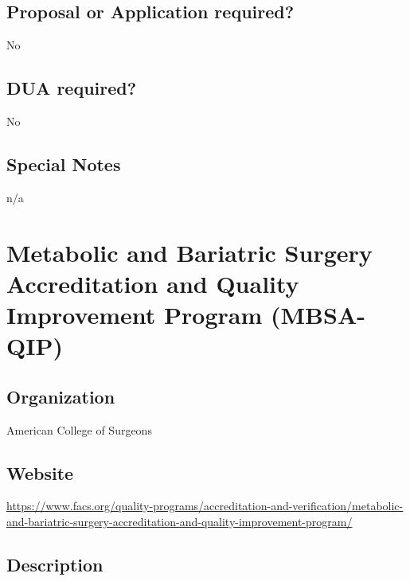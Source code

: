 \documentclass[
]{book}
\begin{document}
\hypertarget{proposal-or-application-required-38}{%
\section{Proposal or Application required?}\label{proposal-or-application-required-38}}

No

\hypertarget{dua-required-38}{%
\section{DUA required?}\label{dua-required-38}}

No

\hypertarget{special-notes-38}{%
\section{Special Notes}\label{special-notes-38}}

n/a

\mainmatter

\hypertarget{metabolic-and-bariatric-surgery-accreditation-and-quality-improvement-program-mbsa-qip}{%
\chapter{Metabolic and Bariatric Surgery Accreditation and Quality Improvement Program (MBSA-QIP)}\label{metabolic-and-bariatric-surgery-accreditation-and-quality-improvement-program-mbsa-qip}}

\hypertarget{organization-39}{%
\section{Organization}\label{organization-39}}

American College of Surgeons

\hypertarget{website-39}{%
\section{Website}\label{website-39}}

\url{https://www.facs.org/quality-programs/accreditation-and-verification/metabolic-and-bariatric-surgery-accreditation-and-quality-improvement-program/}

\hypertarget{description-39}{%
\section{Description}\label{description-39}}
\end{document}

